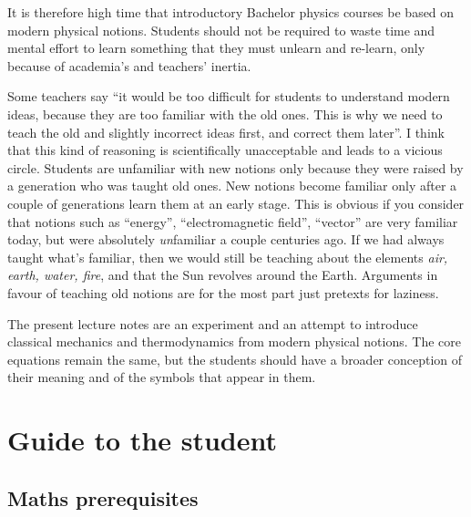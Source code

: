 \documentclass[a4paper,12pt,%
onecolumn,oneside,titlepage,%
british%
]{memoir}
\newcommand{\addsec}[1]{\section*{#1}\addcontentsline{toc}{section}{#1}}
\renewcommand*{\|}[1][]{\nonscript\:#1\vert\nonscript\:\mathopen{}}
\begin{document}
\medskip

It is therefore high time that introductory Bachelor physics courses be based on modern physical notions. Students should not be required to waste time and mental effort to learn something that they must unlearn and re-learn, only because of academia's and teachers' inertia.

Some teachers say \enquote{it would be too difficult for students to understand modern ideas, because they are too familiar with the old ones. This is why we need to teach the old and slightly incorrect ideas first, and correct them later}. I think that this kind of reasoning is scientifically unacceptable and leads to a vicious circle. Students are unfamiliar with new notions only because they were raised by a generation who was taught old ones. New notions become familiar only after a couple of generations learn them at an early stage. This is obvious if you consider that notions such as \enquote{energy}, \enquote{electromagnetic field}, \enquote{vector} are very familiar today, but were absolutely \emph{un}familiar a couple centuries ago. If we had always taught what's familiar, then we would still be teaching about the elements \emph{air, earth, water, fire}, and that the Sun revolves around the Earth. Arguments in favour of teaching old notions are for the most part just pretexts for laziness.

\medskip

The present lecture notes are an experiment and an attempt to introduce classical mechanics and thermodynamics from modern physical notions. The core equations remain the same, but the students should have a broader conception of their meaning and of the symbols that appear in them.



%

\printpagenotes*
\clearpage
\chapter{Guide to the student}
\label{cha:guide}

\addsec{Maths prerequisites}
\label{sec:guide_maths}
\end{document}
